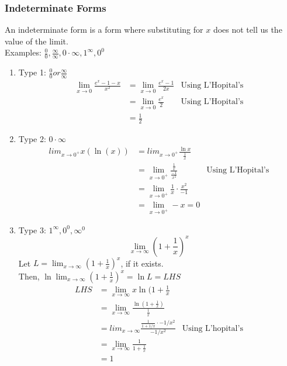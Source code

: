 \documentclass{article}
\begin{document}
\subsubsection{Indeterminate Forms}
An indeterminate form is a form where substituting for $x$ does not tell us the value of the limit.\\
Examples: $\frac{0}{0}, \frac{\infty}{\infty}, 0 \cdot \infty, 1^\infty, 0^0$
\begin{enumerate}
    \item Type 1: $\frac{0}{0} or \frac{\infty}{\infty}$
    \begin{align*}
        \lim_{x \to 0} \frac{e^x - 1 - x}{x^2} & = \lim_{x \to 0} \frac{e^x - 1}{2x} & \text{Using L'Hopital's}\\
        & = \lim_{x \to 0} \frac{e^x}{2} & \text{Using L'Hopital's}\\
        & = \frac{1}{2}
    \end{align*}
    
    \item Type 2: $0 \cdot \infty$
    \begin{align*}
        lim_{x \to 0^+} x(\ln(x)) & = lim_{x \to 0^+} \frac{\ln x}{\frac{1}{x}}\\
        & = \lim_{x \to 0^+} \frac{\frac{1}{x}}{\frac{-1}{x^2}} & \text{Using L'Hopital's}\\
        & = \lim_{ x \to 0^+} \frac{1}{x} \cdot \frac{x^2}{-1}\\
        & = \lim_{x \to 0^+} -x = 0
    \end{align*}
    
    \item Type 3: $1^\infty, 0^0, \infty^0$
    $$\lim_{x \to \infty} (1 + \frac{1}{x})^x$$
    Let $L = \lim_{x \to \infty} (1+ \frac{1}{x})^x$, if it exists.\\
    Then, $\ln \lim_{x \to \infty} (1 + \frac{1}{x})^x = \ln L = LHS$
    \begin{align*}
        LHS & = \lim_{x \to \infty} x \ln (1 + \frac{1}{x}\\
        & = \lim_{x \to \infty} \frac{\ln (1 + \frac{1}{x})}{\frac{1}{x}}\\
        & = lim_{x \to \infty} \frac{\frac{1}{1 + 1/x} \cdot -1/x^2}{-1/x^2} & \text{Using L'hopital's}\\
        & = \lim_{x \to \infty} \frac{1}{1 + \frac{1}{x}}\\
        & = 1
    \end{align*}
\end{enumerate}
\end{document}
